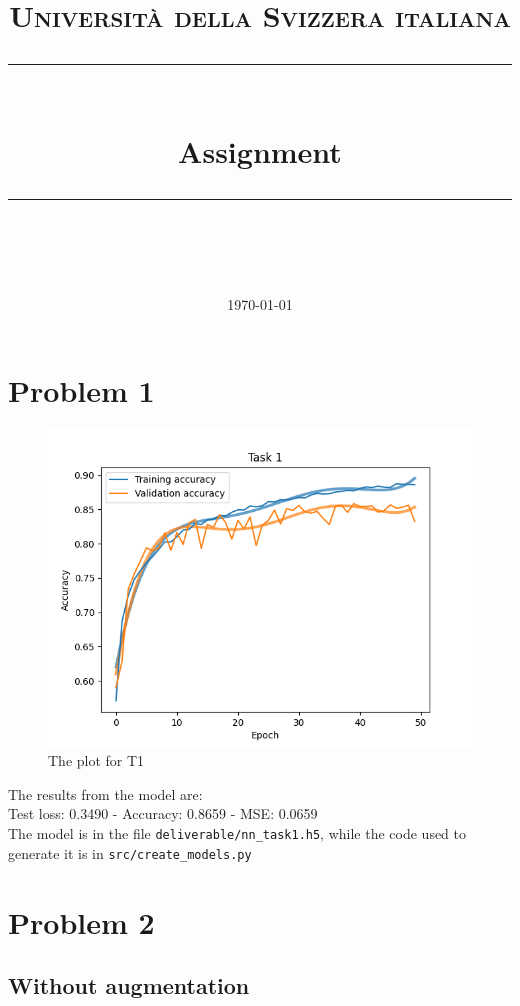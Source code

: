 \documentclass[11pt]{scrartcl}
\title{	
	\normalfont\normalsize
	\textsc{\thecourse\\%
	Università della Svizzera italiana}\\
	\vspace{25pt}
	\rule{\linewidth}{0.5pt}\\
	\vspace{20pt}
	{\huge Assignment \theassnumber}\\
	\vspace{12pt}
	\rule{\linewidth}{0.5pt}\\
	\vspace{12pt}
}
\author{\LARGE \thestudent}
\date{\normalsize\today}
\begin{document}
\maketitle


\section*{Problem 1}

	\begin{figure}[H]
		\centering
		\includegraphics[width=\textwidth]{src/plot_task1.png}
		\caption{The plot for T1}
		\label{fig:plot_T1}
	\end{figure}

	The results from the model are:\\
	
	Test loss: 0.3490 - Accuracy: 0.8659 - MSE: 0.0659\\

	The model is in the file \texttt{deliverable/nn\_task1.h5}, while the code used to 
	generate it is in \texttt{src/create\_models.py}


\section*{Problem 2}

	\subsection*{Without augmentation}
\end{document}
